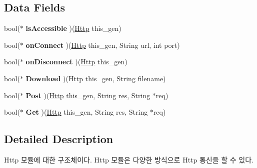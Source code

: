 \subsection*{Data Fields}
\begin{DoxyCompactItemize}
\item 
\hypertarget{struct__Http_a3f21ba58588b0d2e11e7611caf3fa65c}{bool($\ast$ {\bfseries is\-Accessible} )(\hyperlink{struct__Http}{Http} this\-\_\-gen)}\label{struct__Http_a3f21ba58588b0d2e11e7611caf3fa65c}

\item 
\hypertarget{struct__Http_a952cc07a3505431bf33a7a6393a1503a}{bool($\ast$ {\bfseries on\-Connect} )(\hyperlink{struct__Http}{Http} this\-\_\-gen, String url, int port)}\label{struct__Http_a952cc07a3505431bf33a7a6393a1503a}

\item 
\hypertarget{struct__Http_ad6d1f6047ef195fe434e3d259aa0375a}{bool($\ast$ {\bfseries on\-Disconnect} )(\hyperlink{struct__Http}{Http} this\-\_\-gen)}\label{struct__Http_ad6d1f6047ef195fe434e3d259aa0375a}

\item 
\hypertarget{struct__Http_ab1e77582577b37757ed378ed3f86d298}{bool($\ast$ {\bfseries Download} )(\hyperlink{struct__Http}{Http} this\-\_\-gen, String filename)}\label{struct__Http_ab1e77582577b37757ed378ed3f86d298}

\item 
\hypertarget{struct__Http_af5fa9b3c938bda9972d5e4b9f880835b}{bool($\ast$ {\bfseries Post} )(\hyperlink{struct__Http}{Http} this\-\_\-gen, String res, String $\ast$req)}\label{struct__Http_af5fa9b3c938bda9972d5e4b9f880835b}

\item 
\hypertarget{struct__Http_ae18bf127b32304b57ce442c8282fe73a}{bool($\ast$ {\bfseries Get} )(\hyperlink{struct__Http}{Http} this\-\_\-gen, String res, String $\ast$req)}\label{struct__Http_ae18bf127b32304b57ce442c8282fe73a}

\end{DoxyCompactItemize}


\subsection{Detailed Description}
Http 모듈에 대한 구조체이다. Http 모듈은 다양한 방식으로 Http 통신을 할 수 있다. 


